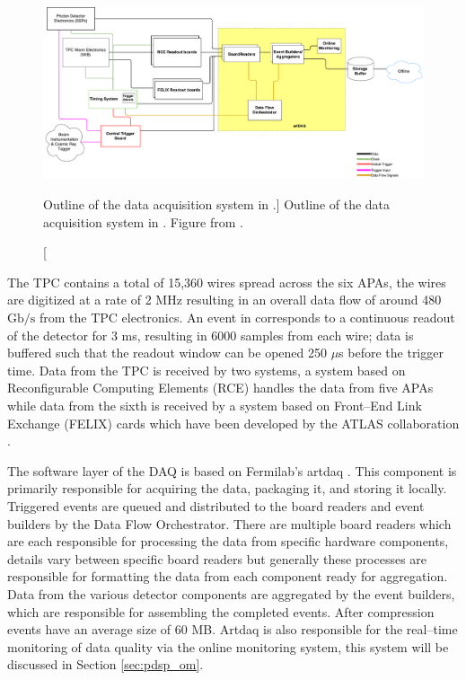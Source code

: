 \begin{figure}

	\centering

	\includegraphics[width=\textwidth]{figures/pdsp_daq.pdf}

	\caption
	[Outline of the data acquisition system in \protodune{}.]
	{Outline of the data acquisition system in \protodune{}. Figure from
	\cite{Abi2017}.}

	\label{fig:pdsp_daq}

\end{figure}

The \protodune{} TPC contains a total of 15,360 wires spread across the six
APAs, the wires are digitized at a rate of 2 MHz resulting in an overall data
flow of around 480 $\mbox{Gb/s}$ from the TPC electronics. An event in
\protudune{} corresponds to a continuous readout of the detector for 3 ms,
resulting in 6000 samples from each wire; data is buffered such that the readout
window can be opened 250 $\mu$s before the trigger time. Data from the TPC is
received by two systems, a system based on Reconfigurable Computing Elements
(RCE) \cite{7431254} handles the data from five APAs while data from the sixth 
is received by a system based on Front--End Link Exchange (FELIX) cards which 
have been developed by the ATLAS collaboration \cite{Anderson_2016}.

The software layer of the \protodune{} DAQ is based on Fermilab's artdaq 
\cite{6495515}. This component is primarily responsible for acquiring the data,
packaging it, and storing it locally. Triggered events are queued and 
distributed to the board readers and event builders by the Data Flow 
Orchestrator. There are multiple board readers which are each responsible for 
processing the data from specific hardware components, details vary between 
specific board readers but generally these processes are responsible for 
formatting the data from each component ready for aggregation. Data from the
various detector components are aggregated by the event builders, which are
responsible for assembling the completed events. After compression events have
an average size of 60 MB. Artdaq is also responsible for the real--time 
monitoring of data quality via the online monitoring system, this system will be
discussed in Section \ref{sec:pdsp_om}.

